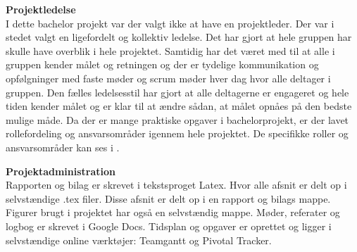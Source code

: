 \textbf{Projektledelse}\\
I dette bachelor projekt var der valgt ikke at have en projektleder. Der var i stedet valgt en ligefordelt og kollektiv ledelse. Det har gjort at hele gruppen har skulle have overblik i hele projektet. Samtidig har det været med til at alle i gruppen kender målet og retningen og der er tydelige kommunikation og opfølgninger med faste møder og scrum møder hver dag hvor alle deltager i gruppen. Den fælles ledelsesstil har gjort at alle deltagerne er engageret og hele tiden kender målet og er klar til at ændre sådan, at målet opnåes på den bedste mulige måde. Da der er mange praktiske opgaver i bachelorprojekt, er der lavet rollefordeling og ansvarsområder igennem hele projektet. De specifikke roller og ansvarsområder kan ses i .

\textbf{Projektadministration}\\
Rapporten og bilag er skrevet i tekstsproget Latex. Hvor alle afsnit er delt op i selvstændige .tex filer. Disse afsnit er delt op i en rapport og bilags mappe. Figurer brugt i projektet har også en selvstændig mappe. Møder, referater og logbog er skrevet i Google Docs. Tidsplan og opgaver er oprettet og ligger i selvstændige online værktøjer: Teamgantt og Pivotal Tracker.    

